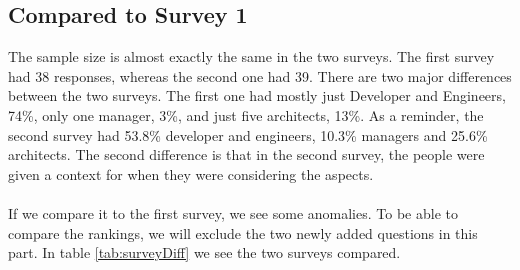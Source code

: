 \documentclass{cslthse-msc}
\begin{document}
    \subsection{Compared to Survey 1}

    The sample size is almost exactly the same in the two surveys. The first
    survey had 38 responses, whereas the second one had 39. There are two
    major differences between the two surveys. The first one had mostly just
    Developer and Engineers, 74\%, only one manager, 3\%, and just five
    architects, 13\%. As a reminder, the second survey had 53.8\% developer
    and engineers, 10.3\% managers and 25.6\% architects. The second
    difference is that in the second survey, the people were given a context
    for when they were considering the aspects.
    \\ \\
    If we compare it to the first survey, we see some anomalies. To be able
    to compare the rankings, we will exclude the two newly added questions
    in this part. In table \ref{tab:surveyDiff} we see the two surveys compared.
\end{document}
